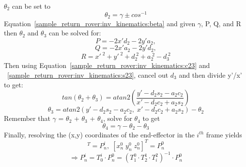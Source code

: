 $\theta_{2}$ can be set to
\begin{equation}
	\theta_{2} = \gamma \pm cos^{-1}
\end{equation}
 Equation~\ref{sample_return_rover:inv_kinematics:beta} and given $\gamma$, P, Q, and R then $\theta_{2}$ and $\theta_{3}$ can be solved for: 
\begin{equation} 
	P = -2x'd_{2}-2y'a_{2} , 
	\label{sample_return_rover:inv_kinematics:P}
\end{equation}
\begin{equation}
	Q = -2x'a_{2}-2y'd_{2} ,
	\label{sample_return_rover:inv_kinematics:Q}
\end{equation}
\begin{equation}
	R = x'^{\;2}+y'^{\;2}+d_{2}^{\;2}+a_{2}^{\;2}-d_{3}^{\; 2}
	\label{sample_return_rover:inv_kinematics:R}
\end{equation}
Then using Equation~\ref{sample_return_rover:inv_kinematics:c23} and ~\ref{sample_return_rover:inv_kinematics:s23}, cancel out $d_{3}$ and then divide y'/x' to get:
\begin{equation}
	tan(\theta_{2} + \theta_{3}) = atan2(\frac{y' - d_{2}s_{2}-a_{2}c_{2}} {x'-d_{2}c_{2}+a_{2}s_{2}})
\end{equation}
\begin{equation}\nonumber
	\theta_{3} = atan2(y' - d_{2}s_{2}-a_{2}c_{2},\; x'-d_{2}c_{2}+a_{2}s_{2})  - \theta_{2}
\end{equation}
Remember that $\gamma$ = $\theta_{2}$ + $\theta_{3}$ + $\theta_{4}$, solve for $\theta_{4}$ to get
\begin{equation}
	\theta_{4} = \gamma - \theta_{2} - \theta_{3}
\end{equation}
Finally, resolving the (x,y) coordinates of the end-effector in the $i^{th}$ frame yields
\begin{equation}
	[x^{i}_{n} \; y^{i}_{n} \; z^{i}_{n}]^T = P^{i}_{n}, \; [x^{0}_{n}\; y^{0}_{n}\; z^{0}_{n}]^T = P^{0}_{n} 
\end{equation}
\begin{equation}
	\Rightarrow P^{i}_{n} = T^{i}_{0}\cdot  P^{0}_{n}  = (T^{0}_{1}\cdot T^{1}_{2}\cdot T^{2}_{i})^{-1} \cdot P^{0}_{n}
\end{equation}